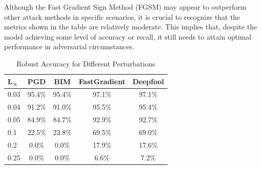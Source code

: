 \documentclass[10pt, conference, a4paper, final]{IEEEtran}
\begin{document}
Although the Fast Gradient Sign Method (FGSM) may appear to outperform other attack methods in specific scenarios, it is crucial to recognize that the metrics shown in the table are relatively moderate. This implies that, despite the model achieving some level of accuracy or recall, it still needs to attain optimal performance in adversarial circumstances.



\begin{table}[ht]
    \centering
    \caption{Robust Accuracy for Different Perturbations}
    \label{tab:robust_accuracy}
    \begin{tabular}{|l|c|c|c|c|}
    \hline
    \textbf{L\ensuremath{_{\infty}}} & \textbf{PGD} & \textbf{BIM} & \textbf{FastGradient} & \textbf{Deepfool} \\ \hline
     0.03        & 95.4\%       & 95.4\%       & 97.1\%               & 97.1\%           \\ \hline
     0.04        & 91.2\%       & 91.0\%       & 95.5\%               & 95.4\%           \\ \hline
     0.05        & 84.9\%       & 84.7\%       & 92.9\%               & 92.7\%           \\ \hline
     0.1         & 22.5\%       & 23.8\%       & 69.5\%               & 69.0\%           \\ \hline
     0.2         & 0.0\%        & 0.0\%        & 17.9\%               & 17.6\%           \\ \hline
     0.25        & 0.0\%        & 0.0\%        & 6.6\%                & 7.2\%            \\ \hline
    \end{tabular}
    \end{table}

   
    
\end{document}
